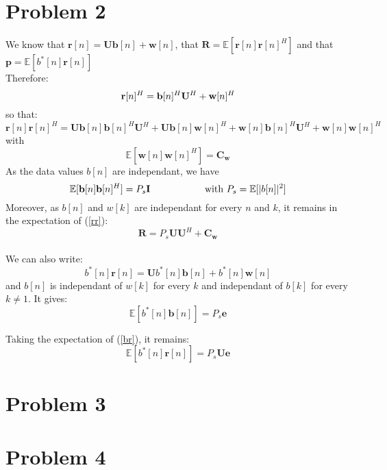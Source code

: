 \documentclass[a4paper]{article}
\begin{document}
\section{Problem 2}
We know that $\mathbf{r}[n]=\mathbf{Ub}[n]+\mathbf{w}[n]$, that $\mathbf{R}=\mathbb{E}[\mathbf{r}[n]{\mathbf{r}[n]}^H]$ and that $\mathbf{p}=\mathbb{E}[b^*[n]\mathbf{r}[n]]$\\
Therefore:
\begin{equation*}
\mathbf{r}[n]^H=\mathbf{b}[n]^H\mathbf{U}^H+\mathbf{w}[n]^H\\
\end{equation*}
so that:
\begin{equation}
\label{rr}
\mathbf{r}[n]\mathbf{r}[n]^H = \mathbf{U}\mathbf{b}[n]\mathbf{b}[n]^H\mathbf{U}^H + \mathbf{U}\mathbf{b}[n]\mathbf{w}[n]^H+\mathbf{w}[n]\mathbf{b}[n]^H\mathbf{U}^H+\mathbf{w}[n]\mathbf{w}[n]^H
\end{equation}
with
\begin{equation*}
\mathbb{E}[\mathbf{w}[n]\mathbf{w}[n]^H] = \mathbf{C_w}
\end{equation*}
As the data values $b[n]$ are independant, we have
\begin{equation*}
\mathbb{E}[\mathbf{b}[n]\mathbf{b}[n]^H] = P_s\mathbf{I}\text{\hspace{2cm}with } P_s=\mathbb{E}[|b[n]|^2]
\end{equation*}
Moreover, as $b[n]$ and $w[k]$ are independant for every $n$ and $k$, it remains in the expectation of (\ref{rr}): 
\begin{equation}
\mathbf{R}=P_s\mathbf{U}\mathbf{U}^H + \mathbf{C_w}
\end{equation}\\ 

We can also write:
\begin{equation}
\label{br}
b^*[n]\mathbf{r}[n]=\mathbf{U}b^*[n]\mathbf{b}[n] + b^*[n]\mathbf{w}[n]
\end{equation}
and $b[n]$ is independant of $w[k]$ for every $k$ and independant of $b[k]$ for every $k\ne1$. It gives:
\begin{equation*}
\mathbb{E}[b^*[n]\mathbf{b}[n]]=P_s\mathbf{e}
\end{equation*}

Taking the expectation of (\ref{br}), it remains:
\begin{equation}
\mathbb{E}[b^*[n]\mathbf{r}[n]]=P_s\mathbf{Ue}
\end{equation}

\section{Problem 3}

\section{Problem 4}
\end{document}
